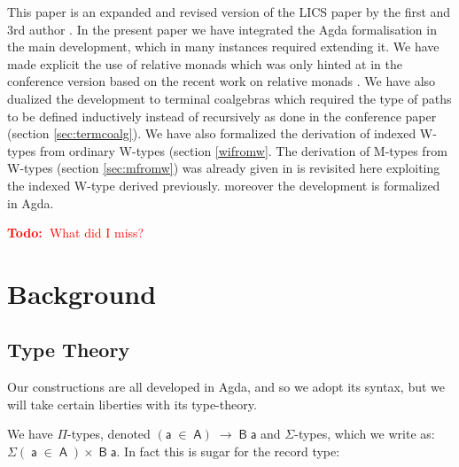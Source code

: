 \documentclass[a4paper]{article}
\makeatletter
\newcommand{\todo}[1]{\textcolor{red}{\textbf{Todo:~}#1}}
\newcommand{\Conid}[1]{\mathit{#1}}
\newcommand{\Varid}[1]{\mathit{#1}}
\newcommand{\anonymous}{\kern0.06em \vbox{\hrule\@width.5em}}
\def\resethooks{%
  \global\let\SaveRestoreHook\empty
  \global\let\ColumnHook\empty}
\newcommand{\hsindent}[1]{\quad}%
\let\hspre\empty
\let\hspost\empty
\renewcommand\Varid[1]{\mathord{\textsf{#1}}}
\let\Conid\Varid
\newcommand\Keyword[1]{\textsf{\textbf{#1}}}
\makeatother
\begin{document}
This paper is an expanded and revised version of the LICS paper by the
first and 3rd author \cite{lics}. In the present paper we have
integrated the Agda formalisation in the main development, which in
many instances required extending it. We have made explicit the use of
relative monads which was only hinted at in the conference version
based on the recent work on relative monads \cite{relmon}. We have
also dualized the development to terminal coalgebras which required
the type of paths to be defined inductively instead of recursively as
done in the conference paper (section \ref{sec:termcoalg}).  We
have also formalized the derivation of indexed W-types from ordinary
W-types (section \ref{wifromw}. The derivation of M-types from W-types
(section \ref{sec:mfromw})
was already given in \cite{C-CSPTs} is revisited here exploiting the
indexed W-type derived previously. moreover the development is formalized in
Agda. 

\todo{What did I miss?}


\section{Background}
\label{sec:background}

 

\subsection{Type Theory}

\newcommand{\prodd}{\ensuremath{\mathaccent\cdot{\prod}}}





Our constructions are all developed in Agda, and so we adopt its syntax, but we will take certain liberties with its type-theory. 

We have $\Pi$-types, denoted \ensuremath{(\Varid{a}\;\in\;\Conid{A})\;\rightarrow\;\Conid{B}\;\Varid{a}} and $\Sigma$-types, which we write as: \ensuremath{\Sigma(\!\;\Varid{a}\;\in\;\Conid{A}\;\!)\!\times\!\;\Conid{B}\;\Varid{a}}. In fact this is sugar for the record type:

\resethooks
\end{document}
